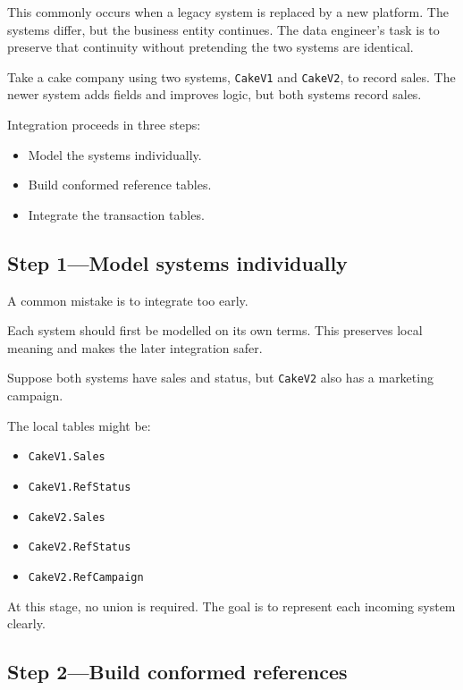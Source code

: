 \documentclass[10pt,openany,10pt]{book}
\providecommand{\tightlist}{%
  \setlength{\itemsep}{0pt}\setlength{\parskip}{0pt}}
\begin{document}
This commonly occurs when a legacy system is replaced by a new platform.
The systems differ, but the business entity continues. The data
engineer's task is to preserve that continuity without pretending the
two systems are identical.

Take a cake company using two systems, \texttt{CakeV1} and
\texttt{CakeV2}, to record sales. The newer system adds fields and
improves logic, but both systems record sales.

Integration proceeds in three steps:

\begin{itemize}
\tightlist
\item
  Model the systems individually.
\item
  Build conformed reference tables.
\item
  Integrate the transaction tables.
\end{itemize}

\subsection{Step 1---Model systems
individually}\label{step-1model-systems-individually}

A common mistake is to integrate too early.

Each system should first be modelled on its own terms. This preserves
local meaning and makes the later integration safer.

Suppose both systems have sales and status, but \texttt{CakeV2} also has
a marketing campaign.

The local tables might be:

\begin{itemize}
\tightlist
\item
  \texttt{CakeV1.Sales}
\item
  \texttt{CakeV1.RefStatus}
\item
  \texttt{CakeV2.Sales}
\item
  \texttt{CakeV2.RefStatus}
\item
  \texttt{CakeV2.RefCampaign}
\end{itemize}

At this stage, no union is required. The goal is to represent each
incoming system clearly.

\subsection{Step 2---Build conformed
references}\label{step-2build-conformed-references}
\end{document}
